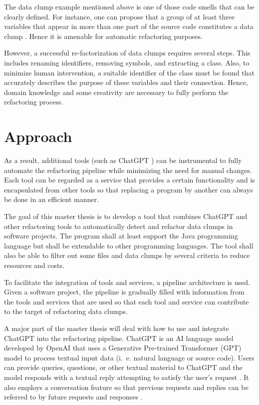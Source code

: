 The data clump example mentioned above is one of those code smells that can be clearly defined. For instance, one can propose that a group of at least three variables that appear in more than one part of the source code constitutes a data clump \cite{zhangImprovingPrecisionFowler2008}. Hence it is amenable for automatic refactoring purposes. 


However, a successful re-factorization of data clumps requires several steps. This includes renaming identifiers, removing symbols, and extracting a class. Also, to minimize human intervention, a suitable identifier of the class must be found that accurately describes the purpose of these variables and their connection. Hence, domain knowledge and some creativity are necessary to fully perform the refactoring process.





\section{Approach}
As a result,  additional tools (such as ChatGPT \cite{ChatGPT_url})  can be instrumental to fully automate the refactoring pipeline while minimizing the need for manual changes.  Each tool can be regarded as  a service that provides a certain functionality and is encapsulated from other tools so that replacing a program by another can always be done in an efficient manner. 


The goal of this master thesis is to develop a tool that combines ChatGPT and other refactoring tools  to automatically detect and refactor data clumps in software projects. The program  shall at least support the Java programming language but shall be extendable to  other programming languages. The tool shall also  be able to filter out some files and data clumps by several criteria to reduce resources and costs. 




To facilitate the integration of tools and services, a pipeline architecture is used. Given a software project, the pipeline is gradually filled with information from the tools and services that are used so that each tool and service can contribute to the target of refactoring data clumps.

A major part of the master thesis will deal with how to use and integrate ChatGPT into the refactoring pipeline. 
ChatGPT is an AI language model developed by OpenAI that uses a Generative Pre-trained Transformer (GPT) model to process textual input data (i.~e. natural language or source code). Users can provide queries, questions, or other textual material to ChatGPT and the model responds with a textual reply attempting to satisfy the user's request \cite{yetistirenEvaluatingCodeQuality2023}. It also employs a conversation feature so that previous requests and replies can be referred to by future requests and responses \cite{sobania2023analysis}.

